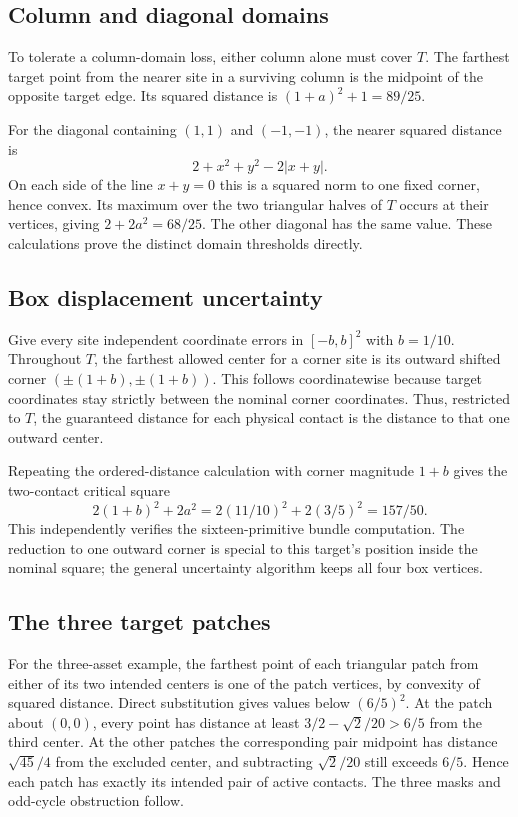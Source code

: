 \subsection{Column and diagonal domains}
To tolerate a column-domain loss, either column alone must cover $T$. The farthest target point from the nearer site in a surviving column is the midpoint of the opposite target edge. Its squared distance is $(1+a)^2+1=89/25$.

For the diagonal containing $(1,1)$ and $(-1,-1)$, the nearer squared distance is
\[
2+x^2+y^2-2|x+y|.
\]
On each side of the line $x+y=0$ this is a squared norm to one fixed corner, hence convex. Its maximum over the two triangular halves of $T$ occurs at their vertices, giving $2+2a^2=68/25$. The other diagonal has the same value. These calculations prove the distinct domain thresholds directly.

\subsection{Box displacement uncertainty}
Give every site independent coordinate errors in $[-b,b]^2$ with $b=1/10$. Throughout $T$, the farthest allowed center for a corner site is its outward shifted corner $(\pm(1+b),\pm(1+b))$. This follows coordinatewise because target coordinates stay strictly between the nominal corner coordinates. Thus, restricted to $T$, the guaranteed distance for each physical contact is the distance to that one outward center.

Repeating the ordered-distance calculation with corner magnitude $1+b$ gives the two-contact critical square
\[
2(1+b)^2+2a^2=2(11/10)^2+2(3/5)^2=157/50.
\]
This independently verifies the sixteen-primitive bundle computation. The reduction to one outward corner is special to this target's position inside the nominal square; the general uncertainty algorithm keeps all four box vertices.

\subsection{The three target patches}
For the three-asset example, the farthest point of each triangular patch from either of its two intended centers is one of the patch vertices, by convexity of squared distance. Direct substitution gives values below $(6/5)^2$. At the patch about $(0,0)$, every point has distance at least $3/2-\sqrt2/20>6/5$ from the third center. At the other patches the corresponding pair midpoint has distance $\sqrt{45}/4$ from the excluded center, and subtracting $\sqrt2/20$ still exceeds $6/5$. Hence each patch has exactly its intended pair of active contacts. The three masks and odd-cycle obstruction follow.

